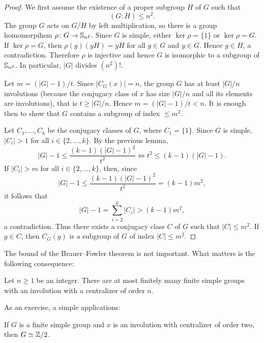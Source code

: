 \begin{proof}
    We first assume the existence of a proper subgroup $H$ of $G$ 
    such that 
    \[
    (G:H)\leq n^2.
    \]
    The group $G$ acts on $G/H$ 
    by left multiplication, so there is a group homomorpihsm 
    $\rho\colon G\to\mathbb{S}_{n^2}$. Since $G$ is simple, either 
    $\ker\rho=\{1\}$ or $\ker\rho=G$. If $\ker\rho=G$, then
    $\rho(g)(yH)=yH$ for all $g\in G$ and $y\in G$. 
    Hence $g\in H$, a contradiction. Therefore $\rho$ is injective
    and hence $G$ is isomorphic to a subgroup of $\mathbb{S}_{n^2}$. 
    In particular, $|G|$ divides $(n^2)!$. 

    Let $m=(|G|-1)/t$. 
    Since $|C_G(x)|=n$, the group $G$ has at least $|G|/n$ involutions (because
    the conjugacy class of $x$ has size $|G|/n$ and all its elements are involutions), 
    that is $t\geq |G|/n$. Hence 
    $m=(|G|-1)/t<n$. It is enough then to show that
    $G$ contains a subgroup of index $\leq m^2$. 

    Let $C_1,\dots,C_k$ be the conjugacy classes of $G$, where $C_1=\{1\}$. 
    Since $G$ is simple, $|C_i|>1$ 
    for all $i\in\{2,\dots,k\}$. By the previous lemma, 
    \[
    |G|-1\leq\frac{(k-1)(|G|-1)^2}{t^2}\Longleftrightarrow t^2\leq(k-1)(|G|-1).
    \]
    If $|C_i|>m$ for all $i\in\{2,\dots,k\}$, then, since 
    \[
    |G|-1\leq\frac{(k-1)(|G|-1)^2}{t^2}=(k-1)m^2,
    \]
    it follows that  
    \[
    |G|-1=\sum_{i=2}^k|C_i|>(k-1)m^2,
    \]
    a contradiction. Thus there exists a conjugacy class
    $C$ of $G$ such that $|C|\leq m^2$. If $g\in C$, then
    $C_G(g)$ is a subgroup of $G$ of index $|C|\leq m^2$.
\end{proof}

The bound of the Brauer--Fowler theorem is not important.
What matters is the following consequence:

\begin{corollary}
    Let $n\geq 1$ be an integer. There are at most finitely many 
    finite simple groups with an involution with a centralizer of order $n$.
\end{corollary}

As an exercise, a simple applications: 

\begin{exercise}
    If $G$ is a finite simple group and $x$ is an involution with
    centralizer of order two, then  
    $G\simeq\mathbb{Z}/2$. 
\end{exercise}


